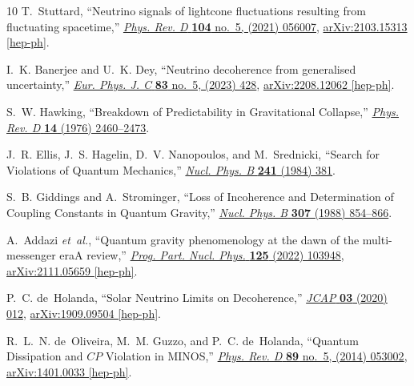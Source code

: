 \documentclass[aps, prd, onecolumn, tightenlines, notitlepage, superscriptaddress, nofootinbib, preprintnumbers, floatfix,showkeys,11pt]{revtex4-2}
\begin{document}
\begin{thebibliography}{10}
T.~Stuttard, ``{Neutrino signals of lightcone fluctuations resulting from
  fluctuating spacetime},''
  \href{http://dx.doi.org/10.1103/PhysRevD.104.056007}{{\em Phys. Rev. D}
  {\bfseries 104} no.~5, (2021) 056007},
  \href{http://arxiv.org/abs/2103.15313}{{\ttfamily arXiv:2103.15313
  [hep-ph]}}.

I.~K. Banerjee and U.~K. Dey, ``{Neutrino decoherence from generalised
  uncertainty},'' \href{http://dx.doi.org/10.1140/epjc/s10052-023-11565-0}{{\em
  Eur. Phys. J. C} {\bfseries 83} no.~5, (2023) 428},
  \href{http://arxiv.org/abs/2208.12062}{{\ttfamily arXiv:2208.12062
  [hep-ph]}}.

S.~W. Hawking, ``{Breakdown of Predictability in Gravitational Collapse},''
  \href{http://dx.doi.org/10.1103/PhysRevD.14.2460}{{\em Phys. Rev. D}
  {\bfseries 14} (1976) 2460--2473}.

J.~R. Ellis, J.~S. Hagelin, D.~V. Nanopoulos, and M.~Srednicki, ``{Search for
  Violations of Quantum Mechanics},''
  \href{http://dx.doi.org/10.1016/0550-3213(84)90053-1}{{\em Nucl. Phys. B}
  {\bfseries 241} (1984) 381}.

S.~B. Giddings and A.~Strominger, ``{Loss of Incoherence and Determination of
  Coupling Constants in Quantum Gravity},''
  \href{http://dx.doi.org/10.1016/0550-3213(88)90109-5}{{\em Nucl. Phys. B}
  {\bfseries 307} (1988) 854--866}.

A.~Addazi {\em et~al.}, ``{Quantum gravity phenomenology at the dawn of the
  multi-messenger era\textemdash{}A review},''
  \href{http://dx.doi.org/10.1016/j.ppnp.2022.103948}{{\em Prog. Part. Nucl.
  Phys.} {\bfseries 125} (2022) 103948},
  \href{http://arxiv.org/abs/2111.05659}{{\ttfamily arXiv:2111.05659
  [hep-ph]}}.

P.~C. de~Holanda, ``{Solar Neutrino Limits on Decoherence},''
  \href{http://dx.doi.org/10.1088/1475-7516/2020/03/012}{{\em JCAP} {\bfseries
  03} (2020) 012}, \href{http://arxiv.org/abs/1909.09504}{{\ttfamily
  arXiv:1909.09504 [hep-ph]}}.

R.~L.~N. de~Oliveira, M.~M. Guzzo, and P.~C. de~Holanda, ``{Quantum Dissipation
  and $C\!P$ Violation in MINOS},''
  \href{http://dx.doi.org/10.1103/PhysRevD.89.053002}{{\em Phys. Rev. D}
  {\bfseries 89} no.~5, (2014) 053002},
  \href{http://arxiv.org/abs/1401.0033}{{\ttfamily arXiv:1401.0033 [hep-ph]}}.


\end{thebibliography}
\end{document}

